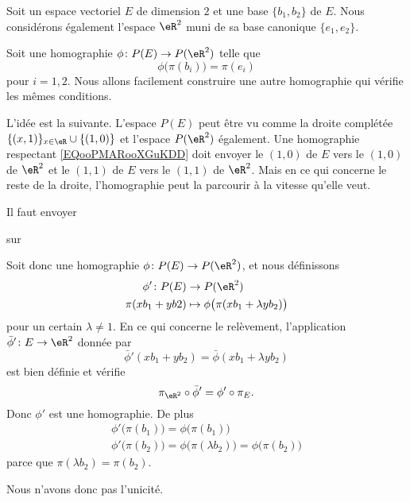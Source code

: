 \begin{example}
	Soit un espace vectoriel \( E\) de dimension \( 2\) et une base \(  \{ b_1,b_2 \}  \) de \( E\). Nous considérons également l'espace \( \eR^2\) muni de sa base canonique \( \{ e_1,e_2 \}\).

	Soit une homographie \( \phi\colon P(E)\to P(\eR^2)\) telle que
	\begin{equation}        \label{EQooPMARooXGuKDD}
		\phi\big( \pi(b_i) \big)=\pi(e_i)
	\end{equation}
	pour \( i=1,2\). Nous allons facilement construire une autre homographie qui vérifie les mêmes conditions.

	L'idée est la suivante. L'espace \( P(E)\) peut être vu comme la droite complétée \( \{ (  x,1   ) \}_{x\in \eR}\cup\{ (1,0) \} \) et l'espace \( P(\eR^2)\) également. Une homographie respectant \eqref{EQooPMARooXGuKDD} doit envoyer le \( (1,0)\) de \( E\) vers le \( (1,0)\) de \( \eR^2\) et le \( (1,1)\) de \( E\) vers le \( (1,1)\) de \( \eR^2\). Mais en ce qui concerne le reste de la droite, l'homographie peut la parcourir à la vitesse qu'elle veut.

	Il faut envoyer

	\begin{center}
		
		sur
		
	\end{center}

	Soit donc une homographie \( \phi\colon P(E)\to P(\eR^2)\), et nous définissons
	\begin{equation}
		\begin{aligned}
			\phi'\colon P(E) & \to P(\eR^2)                                   \\
			\pi(xb_1+yb2)    & \mapsto \phi\big( \pi(xb_1+\lambda yb_2) \big)
		\end{aligned}
	\end{equation}
	pour un certain \( \lambda\neq 1\). En ce qui concerne le relèvement, l'application \( \bar\phi'\colon E\to \eR^2\) donnée par
	\begin{equation}
		\bar\phi'(xb_1+yb_2)=\bar\phi(xb_1+\lambda yb_2)
	\end{equation}
	est bien définie et vérifie
	\begin{equation}
		\pi_{\eR^2}\circ\bar\phi'=\phi'\circ\pi_E.
	\end{equation}
	Donc \( \phi'\) est une homographie. De plus
	\begin{subequations}
		\begin{align}
			\phi'\big( \pi(b_1) \big)=\phi\big( \pi(b_1) \big) \\
			\phi'\big( \pi(b_2) \big)=\phi\big( \pi(\lambda b_2) \big)=\phi\big( \pi(b_2) \big)
		\end{align}
	\end{subequations}
	parce que \( \pi(\lambda b_2)=\pi(b_2)\).

	Nous n'avons donc pas l'unicité.
\end{example}

